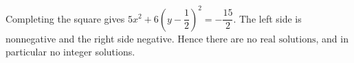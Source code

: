 Completing the square gives $5x^2+6(y-\dfrac{1}{2})^2=-\dfrac{15}{2}$. The left side is nonnegative and the right side negative. Hence there are $\boxed{\text{no real solutions}}$, and in particular no integer solutions.
